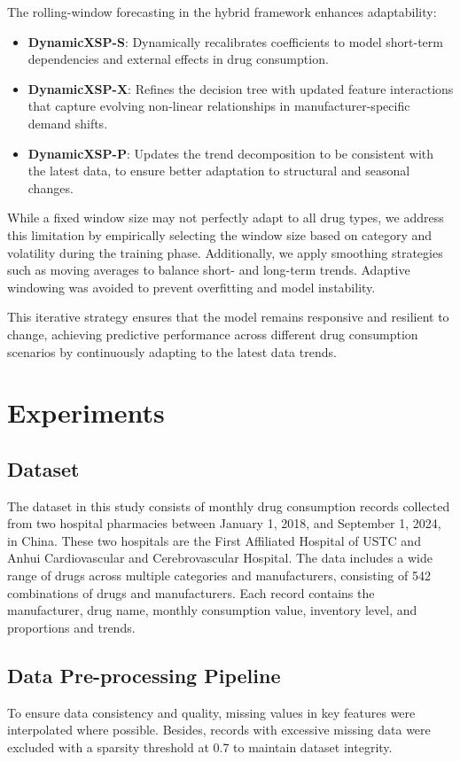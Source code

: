 \documentclass[12pt]{article}
\begin{document}
The rolling-window forecasting in the hybrid framework enhances adaptability:
\begin{itemize}
    \item \textbf{DynamicXSP-S}: Dynamically recalibrates coefficients to model short-term dependencies and external effects in drug consumption.
    \item \textbf{DynamicXSP-X}: Refines the decision tree with updated feature interactions that capture evolving non-linear relationships in manufacturer-specific demand shifts.
    \item \textbf{DynamicXSP-P}: Updates the trend decomposition to be consistent with the latest data, to ensure better adaptation to structural and seasonal changes.
\end{itemize}

While a fixed window size may not perfectly adapt to all drug types, we address this limitation by empirically selecting the window size based on category and volatility during the training phase. Additionally, we apply smoothing strategies such as moving averages to balance short- and long-term trends. Adaptive windowing was avoided to prevent overfitting and model instability.

This iterative strategy ensures that the model remains responsive and resilient to change, achieving predictive performance across different drug consumption scenarios by continuously adapting to the latest data trends.


\section{Experiments}

\subsection{Dataset}
The dataset in this study consists of monthly drug consumption records collected from two hospital pharmacies between January 1, 2018, and September 1, 2024, in China. These two hospitals are the First Affiliated Hospital of USTC and Anhui Cardiovascular and Cerebrovascular Hospital. The data includes a wide range of drugs across multiple categories and manufacturers, consisting of 542 combinations of drugs and manufacturers. Each record contains the manufacturer, drug name, monthly consumption value, inventory level, and proportions and trends. 

\subsection{Data Pre-processing Pipeline}
To ensure data consistency and quality, missing values in key features were interpolated where possible. Besides, records with excessive missing data were excluded with a sparsity threshold at 0.7 to maintain dataset integrity.
\end{document}
